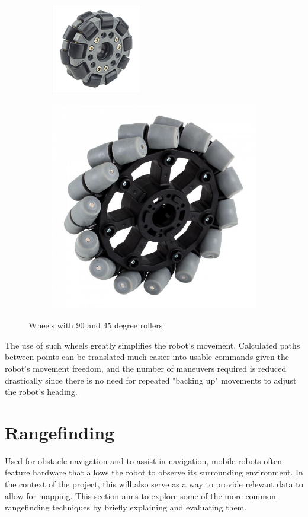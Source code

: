 			\begin{figure}[h]
				\centering
				\begin{subfigure}{.5\textwidth}
					\centering
					\includegraphics[width=.4\linewidth]{ANALYSIS/90degwheel.png}
				\end{subfigure}
				\begin{subfigure}{.5\textwidth}
					\centering
					\includegraphics[width=.4\linewidth]{ANALYSIS/45degwheel.jpg}
				\end{subfigure}
				\caption{Wheels with 90 and 45 degree rollers}
				\label{fig:omnidirectionalwheels}
			\end{figure}
		
			The use of such wheels greatly simplifies the robot's movement. Calculated paths between points can be translated much easier into usable commands given the robot's movement freedom, and the number of maneuvers required is reduced drastically since there is no need for repeated "backing up" movements to adjust the robot's heading.
			
			\section{Rangefinding}
			\label{litreview:rangefinding}
			Used for obstacle navigation and to assist in navigation, mobile robots often feature hardware that allows the robot to observe its surrounding environment. In the context of the project, this will also serve as a way to provide relevant data to allow for mapping. 
			This section aims to explore some of the more common rangefinding techniques by briefly explaining and evaluating them.
			
